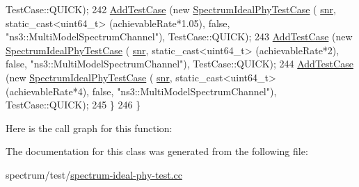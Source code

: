 \begin{DoxyCode}
      TestCase::QUICK);
242       \hyperlink{classns3_1_1TestCase_a3718088e3eefd5d6454569d2e0ddd835}{AddTestCase} (\textcolor{keyword}{new} \hyperlink{classSpectrumIdealPhyTestCase}{SpectrumIdealPhyTestCase} (
      \hyperlink{lte__amc_8m_a7543c5e4e80c828b652e0c63e4a6de70}{snr}, static\_cast<uint64\_t> (achievableRate*1.05), \textcolor{keyword}{false},  \textcolor{stringliteral}{"ns3::MultiModelSpectrumChannel"}), 
      TestCase::QUICK);
243       \hyperlink{classns3_1_1TestCase_a3718088e3eefd5d6454569d2e0ddd835}{AddTestCase} (\textcolor{keyword}{new} \hyperlink{classSpectrumIdealPhyTestCase}{SpectrumIdealPhyTestCase} (
      \hyperlink{lte__amc_8m_a7543c5e4e80c828b652e0c63e4a6de70}{snr}, static\_cast<uint64\_t> (achievableRate*2),    \textcolor{keyword}{false},  \textcolor{stringliteral}{"ns3::MultiModelSpectrumChannel"}), 
      TestCase::QUICK);
244       \hyperlink{classns3_1_1TestCase_a3718088e3eefd5d6454569d2e0ddd835}{AddTestCase} (\textcolor{keyword}{new} \hyperlink{classSpectrumIdealPhyTestCase}{SpectrumIdealPhyTestCase} (
      \hyperlink{lte__amc_8m_a7543c5e4e80c828b652e0c63e4a6de70}{snr}, static\_cast<uint64\_t> (achievableRate*4),    \textcolor{keyword}{false},  \textcolor{stringliteral}{"ns3::MultiModelSpectrumChannel"}), 
      TestCase::QUICK);
245     \}
246 \}
\end{DoxyCode}


Here is the call graph for this function\+:




The documentation for this class was generated from the following file\+:\begin{DoxyCompactItemize}
\item 
spectrum/test/\hyperlink{spectrum-ideal-phy-test_8cc}{spectrum-\/ideal-\/phy-\/test.\+cc}\end{DoxyCompactItemize}
